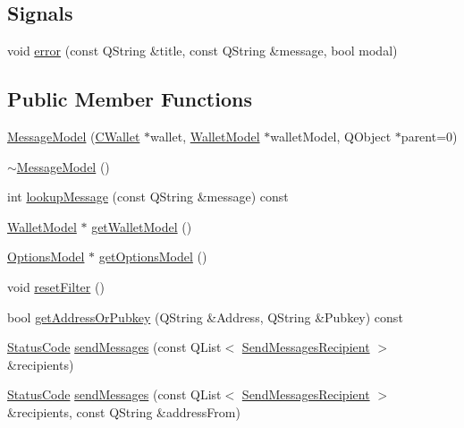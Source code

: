 \subsection*{Signals}
\begin{DoxyCompactItemize}
\item 
void \hyperlink{class_message_model_a506804d291f1cae01b8fbc22c0a12693}{error} (const Q\+String \&title, const Q\+String \&message, bool modal)
\end{DoxyCompactItemize}
\subsection*{Public Member Functions}
\begin{DoxyCompactItemize}
\item 
\hyperlink{class_message_model_abb708f049aab665144d273ae56baf2ec}{Message\+Model} (\hyperlink{class_c_wallet}{C\+Wallet} $\ast$wallet, \hyperlink{class_wallet_model}{Wallet\+Model} $\ast$wallet\+Model, Q\+Object $\ast$parent=0)
\item 
\hyperlink{class_message_model_a70a4aef17be44ef4a07ad17f5f630a30}{$\sim$\+Message\+Model} ()
\item 
int \hyperlink{class_message_model_aae76e8457be0de6ca10fe602d2be68f4}{lookup\+Message} (const Q\+String \&message) const 
\item 
\hyperlink{class_wallet_model}{Wallet\+Model} $\ast$ \hyperlink{class_message_model_ac397797af720d2da96739ba7deecd938}{get\+Wallet\+Model} ()
\item 
\hyperlink{class_options_model}{Options\+Model} $\ast$ \hyperlink{class_message_model_ae7eb986b2f9e4074871406e3fb0cfb91}{get\+Options\+Model} ()
\item 
void \hyperlink{class_message_model_a0a4f4df3a21e41803449692592f8d343}{reset\+Filter} ()
\item 
bool \hyperlink{class_message_model_a272e7ceeba4664046472e6f7c4d49d23}{get\+Address\+Or\+Pubkey} (Q\+String \&Address, Q\+String \&Pubkey) const 
\item 
\hyperlink{class_message_model_adac070d47edccd1bc8358cdc976f8509}{Status\+Code} \hyperlink{class_message_model_abeda81bd7dd800217f6f9c196559810b}{send\+Messages} (const Q\+List$<$ \hyperlink{class_send_messages_recipient}{Send\+Messages\+Recipient} $>$ \&recipients)
\item 
\hyperlink{class_message_model_adac070d47edccd1bc8358cdc976f8509}{Status\+Code} \hyperlink{class_message_model_a76c42a7c0940348d6c2bdd2111cc6424}{send\+Messages} (const Q\+List$<$ \hyperlink{class_send_messages_recipient}{Send\+Messages\+Recipient} $>$ \&recipients, const Q\+String \&address\+From)
\end{DoxyCompactItemize}
